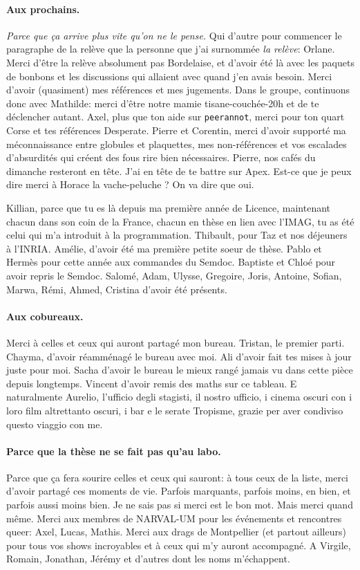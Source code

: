 \medskip
\paragraph*{Aux prochains.}
\emph{Parce que ça arrive plus vite qu'on ne le pense.}
Qui d'autre pour commencer le paragraphe de la relève que la personne que j'ai surnommée \emph{la relève}: Orlane. Merci d'être la relève absolument pas Bordelaise, et d'avoir été là avec les paquets de bonbons et les discussions qui allaient avec quand j'en avais besoin. Merci d'avoir (quasiment) mes références et mes jugements.
Dans le groupe, continuons donc avec Mathilde: merci d'être notre mamie tisane-couchée-20h et de te déclencher autant.
Axel, plus que ton aide sur \texttt{peerannot}, merci pour ton quart Corse et tes références Desperate.
Pierre et Corentin, merci d'avoir supporté ma méconnaissance entre globules et plaquettes, mes non-références et vos escalades d'absurdités qui créent des fous rire bien nécessaires.
Pierre, nos cafés du dimanche resteront en tête.
J'ai en tête de te battre sur Apex.
Est-ce que je peux dire merci à Horace la vache-peluche ? On va dire que oui.

Killian, parce que tu es là depuis ma première année de Licence, maintenant chacun dans son coin de la France, chacun en thèse en lien avec l'IMAG, tu as été celui qui m'a introduit à la programmation.
Thibault, pour Taz et nos déjeuners à l'INRIA.
Amélie, d'avoir été ma première petite soeur de thèse.
Pablo et Hermès pour cette année aux commandes du Semdoc.
Baptiste et Chloé pour avoir repris le Semdoc.
Salomé, Adam, Ulysse, Gregoire, Joris, Antoine, Sofian, Marwa, Rémi, Ahmed, Cristina d'avoir été présents.

\medskip

\paragraph*{Aux cobureaux.}
Merci à celles et ceux qui auront partagé mon bureau.
Tristan, le premier parti.
Chayma, d'avoir réamménagé le bureau avec moi.
Ali d'avoir fait tes mises à jour juste pour moi.
Sacha d'avoir le bureau le mieux rangé jamais vu dans cette pièce depuis longtemps.
Vincent d'avoir remis des maths sur ce tableau.
E naturalmente Aurelio, l'ufficio degli stagisti, il nostro ufficio, i cinema oscuri con i loro film altrettanto oscuri, i bar e le serate Tropisme, grazie per aver condiviso questo viaggio con me.

\medskip

\paragraph*{Parce que la thèse ne se fait pas qu'au labo.}
Parce que ça fera sourire celles et ceux qui sauront: à tous ceux de la liste, merci d'avoir partagé ces moments de vie. Parfois marquants, parfois moins, en bien, et parfois aussi moins bien. Je ne sais pas si merci est le bon mot. Mais merci quand même.
Merci aux membres de NARVAL-UM pour les événements et rencontres queer: Axel, Lucas, Mathis.
Merci aux drags de Montpellier (et partout ailleurs) pour tous vos shows incroyables et à ceux qui m'y auront accompagné.
A Virgile, Romain, Jonathan, Jérémy et d'autres dont les noms m'échappent.

